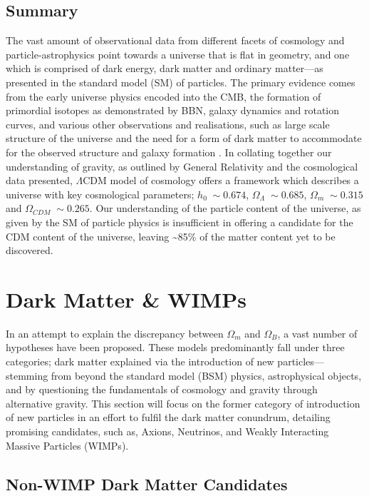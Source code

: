 \subsection{Summary}
\label{subsec:evidence_summary}

The vast amount of observational data from different facets of cosmology and particle-astrophysics point towards a universe that is flat in geometry, and one which is comprised of dark energy, dark matter and ordinary matter---as presented in the standard model (SM) of particles. The primary evidence comes from the early universe physics encoded into the CMB, the formation of primordial isotopes as demonstrated by BBN, galaxy dynamics and rotation curves, and various other observations and realisations, such as large scale structure of the universe and the need for a form of dark matter to accommodate for the observed structure and galaxy formation \cite{LSS_coles}. In collating together our understanding of gravity, as outlined by General Relativity and the cosmological data presented, $\Lambda$CDM model of cosmology offers a framework which describes a universe with key cosmological parameters; $h_0 \; \sim0.674$, $\Omega_{\Lambda} \; \sim0.685$, $\Omega_{m} \; \sim0.315$  and $\Omega_{CDM} \; \sim0.265$. Our understanding of the particle content of the universe, as given by the SM of particle physics is insufficient in offering a candidate for the CDM content of the universe, leaving \sim 85\% of the matter content yet to be discovered.


\section{Dark Matter \& WIMPs}
\label{sec:candidates}

In an attempt to explain the discrepancy between $\Omega_{m}$ and $\Omega_{B}$, a vast number of hypotheses have been proposed. These models predominantly fall under three categories; dark matter explained via the introduction of new particles---stemming from beyond the standard model (BSM) physics, astrophysical objects, and by questioning the fundamentals of cosmology and gravity through alternative gravity. This section will focus on the former category of introduction of new particles in an effort to fulfil the dark matter conundrum, detailing promising candidates, such as, Axions, Neutrinos, and Weakly Interacting Massive Particles (WIMPs). 

\subsection{Non-WIMP Dark Matter Candidates}
\label{subsec:non_wimp_dm}

